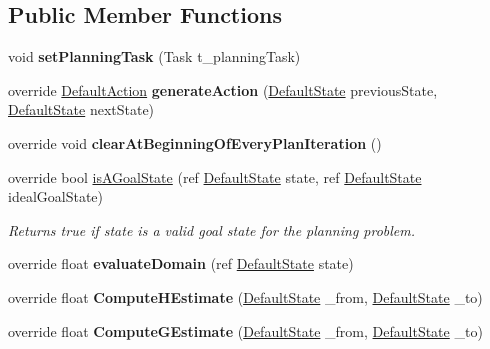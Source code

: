 \subsection*{Public Member Functions}
\begin{DoxyCompactItemize}
\item 
\hypertarget{class_a_r_astar_domain_a4dc68e076d4738c797c22a52f7853fc3}{void {\bfseries set\-Planning\-Task} (Task t\-\_\-planning\-Task)}\label{class_a_r_astar_domain_a4dc68e076d4738c797c22a52f7853fc3}

\item 
\hypertarget{class_a_r_astar_domain_ab246607e9d2bcc02d129dc0414a4de33}{override \hyperlink{class_default_action}{Default\-Action} {\bfseries generate\-Action} (\hyperlink{class_default_state}{Default\-State} previous\-State, \hyperlink{class_default_state}{Default\-State} next\-State)}\label{class_a_r_astar_domain_ab246607e9d2bcc02d129dc0414a4de33}

\item 
\hypertarget{class_a_r_astar_domain_a84137b03c38d5085c79ce15d42b8fa21}{override void {\bfseries clear\-At\-Beginning\-Of\-Every\-Plan\-Iteration} ()}\label{class_a_r_astar_domain_a84137b03c38d5085c79ce15d42b8fa21}

\item 
override bool \hyperlink{class_a_r_astar_domain_a98710baa163975101bee4a3b5c8ba439}{is\-A\-Goal\-State} (ref \hyperlink{class_default_state}{Default\-State} state, ref \hyperlink{class_default_state}{Default\-State} ideal\-Goal\-State)
\begin{DoxyCompactList}\small\item\em Returns true if state is a valid goal state for the planning problem. \end{DoxyCompactList}\item 
\hypertarget{class_a_r_astar_domain_ae4a5180a514904b4e689da12746f1412}{override float {\bfseries evaluate\-Domain} (ref \hyperlink{class_default_state}{Default\-State} state)}\label{class_a_r_astar_domain_ae4a5180a514904b4e689da12746f1412}

\item 
\hypertarget{class_a_r_astar_domain_a94b2a2fb1766938d4da597ebf3fa16fd}{override float {\bfseries Compute\-H\-Estimate} (\hyperlink{class_default_state}{Default\-State} \-\_\-from, \hyperlink{class_default_state}{Default\-State} \-\_\-to)}\label{class_a_r_astar_domain_a94b2a2fb1766938d4da597ebf3fa16fd}

\item 
\hypertarget{class_a_r_astar_domain_ae5d72a77811f6c7ec9eb48e2c4d895f0}{override float {\bfseries Compute\-G\-Estimate} (\hyperlink{class_default_state}{Default\-State} \-\_\-from, \hyperlink{class_default_state}{Default\-State} \-\_\-to)}\label{class_a_r_astar_domain_ae5d72a77811f6c7ec9eb48e2c4d895f0}


\end{DoxyCompactItemize}
